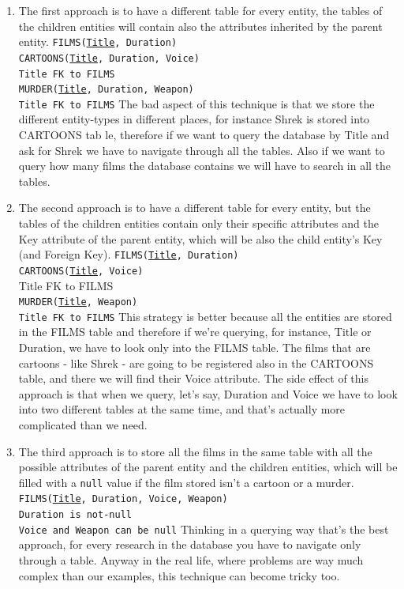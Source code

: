 \documentclass[class=book, crop=false, oneside]{standalone}
\newcommand\tab[1][1cm]{\hspace*{#1}}
\begin{document}
\begin{enumerate}
	\item The first approach is to have a different table for every entity, the tables of the children entities will contain also the attributes inherited by the parent entity.
	\vskip 5pt
	\texttt{FILMS(\underline{Title}, Duration)}\\
	\texttt{CARTOONS(\underline{Title}, Duration, Voice)}\\
	  	\tab[.8cm] \texttt{Title FK to FILMS}\\
	\texttt{MURDER(\underline{Title}, Duration, Weapon)}\\
		\tab[.8cm] \texttt{Title FK to FILMS}
	\vskip 5pt
	The bad aspect of this technique is that we store the different entity-types in different places, for instance Shrek is stored into CARTOONS tab	le, therefore if we want to query the database by Title and ask for Shrek we have to navigate through all the tables. Also if we want to query how many films the database contains we will have to search in all the tables.
	\item The second approach is to have a different table for every entity, but the tables of the children entities contain only their specific attributes and the Key attribute of the parent entity, which will be also the child entity's Key (and Foreign Key).
	\vskip 5pt
	\texttt{FILMS(\underline{Title}, Duration)}\\
	\texttt{CARTOONS(\underline{Title}, Voice)}\\
	  	\tab[.8cm] Title FK to FILMS\\
	\texttt{MURDER(\underline{Title}, Weapon)}\\
		\tab[.8cm] \texttt{Title FK to FILMS}
	\vskip 5pt
	This strategy is better because all the entities are stored in the FILMS table and therefore if we're querying, for instance, Title or Duration, we have to look only into the FILMS table. The films that are cartoons - like Shrek - 	are going to be registered also in the CARTOONS table, and there we will find their Voice attribute.
	The side effect of this approach is that when we query, let's say, Duration and Voice we have to look into two different tables at the same time, and that's actually more complicated than we need.
	\item The third approach is to store all the films in the same table with all the possible attributes of the parent entity and the children entities, which will be filled with a \texttt{null} value if the film stored isn't a cartoon or a murder.
	\vskip 5pt
	\texttt{FILMS(\underline{Title}, Duration, Voice, Weapon)}\\
	\tab[.4cm] \texttt{Duration is not-null}\\
	\tab[.4cm] \texttt{Voice and Weapon can be null}
	\vskip 5pt
	Thinking in a querying way that's the best approach, for every research in the database you have to navigate only through a table. Anyway in the real life, where problems are way much complex than our examples, this technique can become tricky too.
\end{enumerate}
\end{document}
